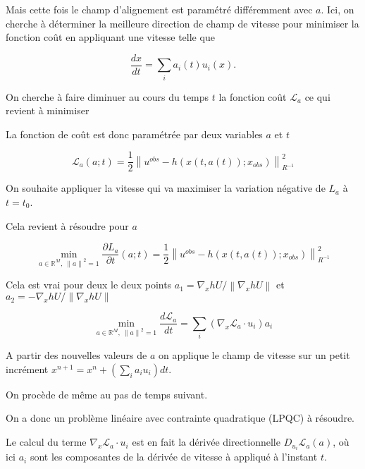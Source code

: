 \documentclass{article}
\newcommand{\norm}[1]{\left\lVert #1 \right\rVert}
\begin{document}
Mais cette fois le champ d'alignement est paramétré différemment avec $a$.
Ici, on cherche à déterminer la meilleure direction de champ de vitesse pour minimiser la fonction coût en appliquant une vitesse telle que

\begin{equation*}
    \frac{dx}{dt} = \sum_i a_i(t) u_i(x).
\end{equation*}

On cherche à faire diminuer au cours du temps $t$ la fonction coût $\mathcal L_a$ ce qui revient à minimiser

La fonction de coût est donc paramétrée par deux variables $a$ et $t$

\begin{equation*}
    \mathcal L_a(a;t) =  \frac12 \norm{u^{obs} - h(x(t,a(t)); x_{obs})}^2_{R^{-1}}
\end{equation*}

On souhaite appliquer la vitesse qui va maximiser la variation négative de $L_a$ à $t=t_0$.

Cela revient à résoudre pour $a$

\begin{equation*}
    \min_{a\in \mathbb{R}^M,~\norm{a}^2 = 1} \frac{\partial L_a}{\partial t}(a;t) =  \frac12 \norm{u^{obs} - h(x(t,a(t)); x_{obs})}^2_{R^{-1}}
\end{equation*}

Cela est vrai pour deux le deux points $a_1 = \nabla_x h U / \norm{\nabla_x h U }$ et $a_2 = - \nabla_x h U / \norm{\nabla_x h U }$

\begin{equation*}
    \min_{a \in \mathbb{R}^M,~\norm{a}^2 = 1} \frac{d \mathcal L_a}{dt} = \sum_i (\nabla_x \mathcal L_a \cdot u_i ) a_i
\end{equation*}

A partir des nouvelles valeurs de $a$ on applique le champ de vitesse sur un petit incrément $x^{n+1} = x^n + \left(\sum_i a_i u_i\right) dt$.

On procède de même au pas de temps suivant.

On a donc un problème linéaire avec contrainte quadratique (LPQC) à résoudre.

Le calcul du terme $\nabla_x \mathcal L_a \cdot u_i$ est en fait la dérivée directionnelle $D_{u_i} \mathcal L_a(a)$, où ici $a_i$ sont les composantes de la dérivée de vitesse à appliqué à l'instant $t$.
\end{document}
